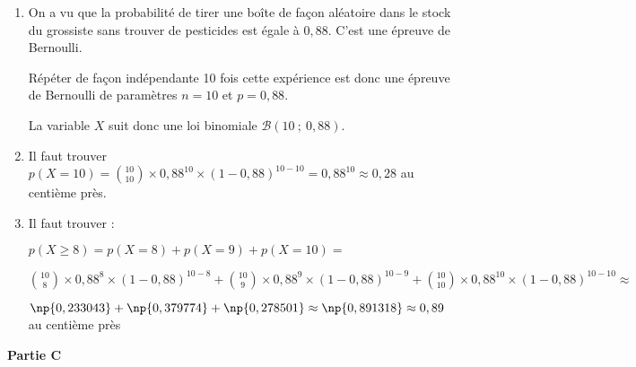 \documentclass[10pt]{article}
\begin{document}
\medskip
 
% 
%
 
\begin{enumerate}
\item %
On a vu que la probabilité de tirer une boîte de façon aléatoire dans le stock du grossiste sans trouver de pesticides est égale à $0,88$. C'est une épreuve de Bernoulli.

Répéter de façon indépendante 10 fois cette expérience est donc une épreuve de Bernoulli de paramètres $n = 10$ et $p = 0,88$.

La variable $X$ suit donc une loi binomiale $\mathcal{B}(10~;~0,88)$.   
\item %
Il faut trouver $p(X = 10) = \binom{10}{10}\times 0,88^{10}\times (1 - 0,88)^{10 - 10} = 0,88^{10} \approx 0,28$ au centième près.
\item %
Il faut trouver :

$p(X \geqslant 8) = p(X = 8) + p(X = 9) + p(X = 10) = $

$\binom{10}{8}\times 0,88^{8}\times (1 - 0,88)^{10 - 8} + \binom{10}{9}\times 0,88^{9}\times (1 - 0,88)^{10 - 9} + \binom{10}{10}\times 0,88^{10}\times (1 - 0,88)^{10 - 10} \approx$

$ \np{0,233043} + \np{0,379774} + \np{0,278501} \approx \np{0,891318} \approx 0,89$ au centième près
\end{enumerate}
 
\newpage
 
\textbf{Partie C}

\medskip
 
%
%
% 
% 
\end{document}

